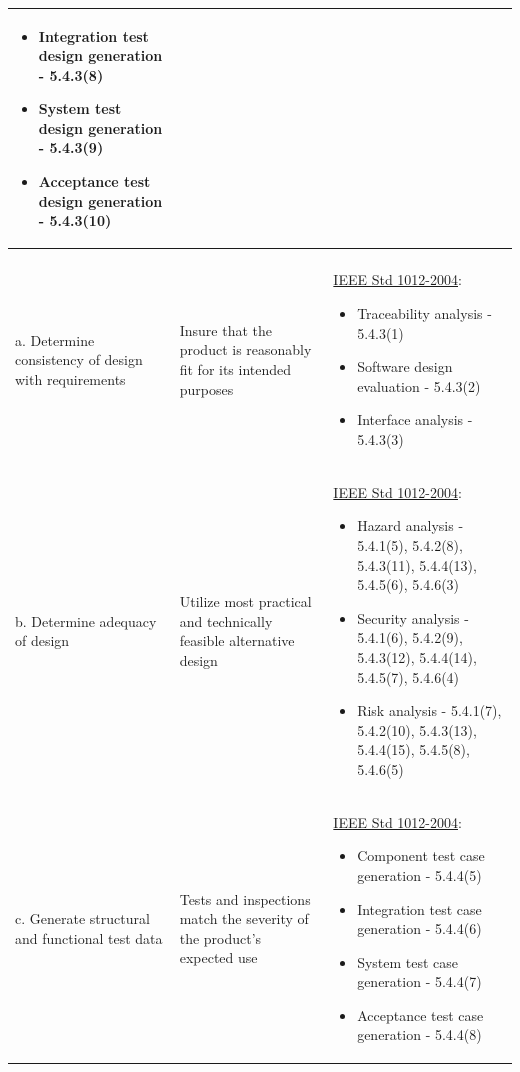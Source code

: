 \begin{longtable}{| p{2in} | p{2in} | p{2in} |}
\begin{small}
\begin{itemize}
\item Integration test design generation - 5.4.3(8)
\item System test design generation - 5.4.3(9)
\item Acceptance test design generation - 5.4.3(10)
\end{itemize}\end{small}\\
\hline \newpage
\multicolumn{3}{|c|}{\textit{\textbf{2. Design}}}\\
\hline
a. Determine consistency of design with requirements & Insure that the product
is reasonably fit for its intended purposes & \underline{IEEE Std 1012-2004}:
\begin{small}\begin{itemize}
\item Traceability analysis - 5.4.3(1)
\item Software design evaluation - 5.4.3(2)
\item Interface analysis - 5.4.3(3)
\end{itemize}\end{small}\\
\hline
b. Determine adequacy of design & Utilize most practical and technically
feasible alternative design & \underline{IEEE Std 1012-2004}:
\begin{small}\begin{itemize}
\item Hazard analysis - 5.4.1(5), 5.4.2(8), 5.4.3(11), 5.4.4(13), 5.4.5(6), 5.4.6(3)
\item Security analysis - 5.4.1(6), 5.4.2(9), 5.4.3(12), 5.4.4(14), 5.4.5(7), 5.4.6(4)
\item Risk analysis - 5.4.1(7), 5.4.2(10), 5.4.3(13), 5.4.4(15), 5.4.5(8), 5.4.6(5)
\end{itemize}\end{small}\\
\hline
c. Generate structural and functional test data & Tests and inspections match
the severity of the product's expected use & \underline{IEEE Std 1012-2004}:
\begin{small}\begin{itemize}
\item Component test case generation - 5.4.4(5)
\item Integration test case generation - 5.4.4(6)
\item System test case generation - 5.4.4(7)
\item Acceptance test case generation - 5.4.4(8)
\end{itemize}\end{small}\\

\end{longtable}
